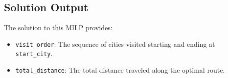 \documentclass{article}
\begin{document}
\subsection*{Solution Output}

The solution to this MILP provides:
\begin{itemize}
    \item \texttt{visit\_order}: The sequence of cities visited starting and ending at \texttt{start\_city}.
    \item \texttt{total\_distance}: The total distance traveled along the optimal route.
\end{itemize}
\end{document}
